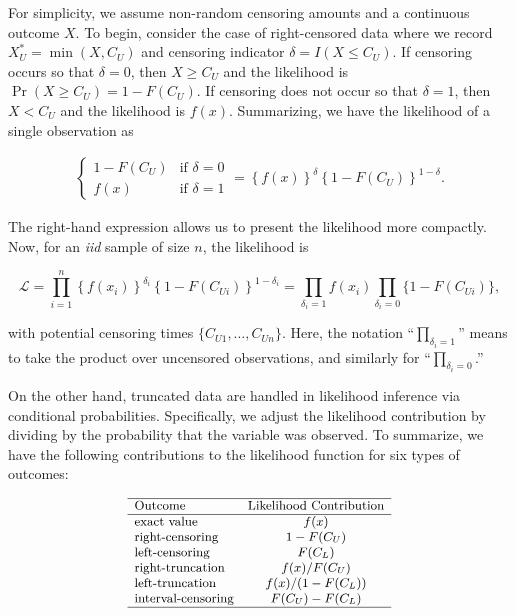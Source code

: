 \documentclass[]{book}
\theoremstyle{definition}
\theoremstyle{definition}
\theoremstyle{definition}
\theoremstyle{remark}
\begin{document}
For simplicity, we assume non-random censoring amounts and a continuous
outcome \(X\). To begin, consider the case of right-censored data where
we record \(X_U^{\ast}= \min(X, C_U)\) and censoring indicator
\(\delta= I(X \leq C_U)\). If censoring occurs so that \(\delta=0\),
then \(X \geq C_U\) and the likelihood is
\(\Pr(X \geq C_U) = 1-F(C_U)\). If censoring does not occur so that
\(\delta=1\), then \(X < C_U\) and the likelihood is \(f(x)\).
Summarizing, we have the likelihood of a single observation as

\[
\begin{aligned}
\left\{
\begin{array}{ll}
1-F(C_U) & \text{if }\delta=0 \\
f(x) & \text{if } \delta = 1 
\end{array}
\right. = \left\{ f(x)\right\}^{\delta} \left\{1-F(C_U)\right\}^{1-\delta} .
\end{aligned}
\]

The right-hand expression allows us to present the likelihood more
compactly. Now, for an \emph{iid} sample of size \(n\), the likelihood
is

\[
\mathcal{L} = 
\prod_{i=1}^n \left\{ f(x_i)\right\}^{\delta_i} \left\{1-F(C_{Ui})\right\}^{1-\delta_i} = \prod_{\delta_i=1} f(x_i) \prod_{\delta_i=0} \{1-F(C_{Ui})\},
\]

with potential censoring times \(\{ C_{U1}, \ldots,C_{Un} \}\). Here,
the notation ``\(\prod_{\delta_i=1}\)'' means to take the product over
uncensored observations, and similarly for ``\(\prod_{\delta_i=0}\).''

On the other hand, truncated data are handled in likelihood inference
via conditional probabilities. Specifically, we adjust the likelihood
contribution by dividing by the probability that the variable was
observed. To summarize, we have the following contributions to the
likelihood function for six types of outcomes:

\[
{\small
\begin{array}{lc}
\hline
\text{Outcome} & \text{Likelihood Contribution} \\
\hline
\text{exact value} & f(x) \\
\text{right-censoring} & 1-F(C_U) \\
\text{left-censoring} & F(C_L) \\
\text{right-truncation} & f(x)/F(C_U) \\
\text{left-truncation} & f(x)/(1-F(C_L)) \\
\text{interval-censoring} & F(C_U)-F(C_L) \\
\hline
\end{array}
}
\]
\end{document}
